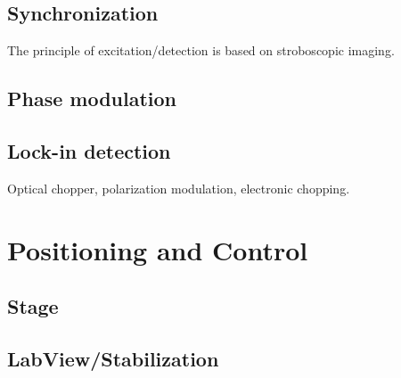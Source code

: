 \documentclass{article}
\begin{document}
\subsection{Synchronization}
The principle of excitation/detection is based on stroboscopic imaging.

\subsection{Phase modulation}

\subsection{Lock-in detection}
Optical chopper, polarization modulation, electronic chopping.

\section{Positioning and Control}

\subsection{Stage}

\subsection{LabView/Stabilization}
\end{document}
